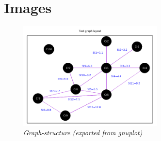 \documentclass{article}                                                                                                     %
\begin{document}
\section{Images}                                                                                                            %
\label{sec:images}                                                                                                          %
  \begin{figure}[ht!]                                                                                                       %
    \centering                                                                                                              %
    \includegraphics[width=0.65\textwidth]{../../sw/gnuplot/exports/imgs/test_graph.png}                                    %
    \caption{\textit{Graph-structure (exported from gnuplot)}}                                                              %
    \label{fig:gnuplot1}                                                                                                    %
  \end{figure}                                                                                                              %
\end{document}
